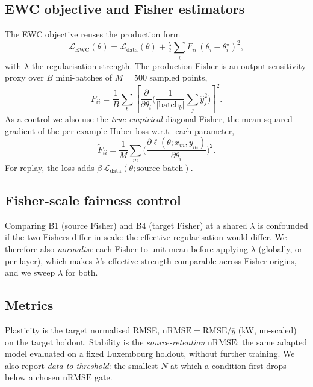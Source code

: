 \documentclass[conference]{IEEEtran}
\newcommand{\nrmse}{\mathrm{nRMSE}}
\begin{document}
\subsection{EWC objective and Fisher estimators}
The EWC objective reuses the production form
\begin{equation}
\mathcal{L}_{\mathrm{EWC}}(\theta)=\mathcal{L}_{\mathrm{data}}(\theta)
+\tfrac{\lambda}{2}\sum_i F_{ii}\,(\theta_i-\theta^{\star}_i)^2 ,
\end{equation}
with $\lambda$ the regularisation strength. The production Fisher is an
output-sensitivity proxy over $B$ mini-batches of $M{=}500$ sampled points,
\begin{equation}
F_{ii}=\frac{1}{B}\sum_b\!\left[\frac{\partial}{\partial\theta_i}
\Big(\frac{1}{|\mathrm{batch}_b|}\sum_j \hat{y}_j^2\Big)\right]^{2}.
\label{eq:proxyfisher}
\end{equation}
As a control we also use the \emph{true empirical} diagonal Fisher, the mean
squared gradient of the per-example Huber loss w.r.t.\ each parameter,
\begin{equation}
\tilde F_{ii}=\frac{1}{M}\sum_{m}\Big(\frac{\partial \ell(\theta;x_m,y_m)}
{\partial \theta_i}\Big)^{2}.
\label{eq:empfisher}
\end{equation}
For replay, the loss adds $\beta\,\mathcal{L}_{\mathrm{data}}(\theta;\text{source
batch})$.

\subsection{Fisher-scale fairness control}
Comparing B1 (source Fisher) and B4 (target Fisher) at a shared $\lambda$ is
confounded if the two Fishers differ in scale: the effective regularisation would
differ. We therefore also \emph{normalise} each Fisher to unit mean before
applying $\lambda$ (globally, or per layer), which makes $\lambda$'s effective
strength comparable across Fisher origins, and we sweep $\lambda$ for both.

\subsection{Metrics}
Plasticity is the target normalised RMSE,
$\nrmse=\mathrm{RMSE}/\overline{y}$ (kW, un-scaled) on the target holdout.
Stability is the \emph{source-retention} $\nrmse$: the same adapted model
evaluated on a fixed Luxembourg holdout, without further training. We also report
\emph{data-to-threshold}: the smallest $N$ at which a condition first drops below
a chosen $\nrmse$ gate.
\end{document}
